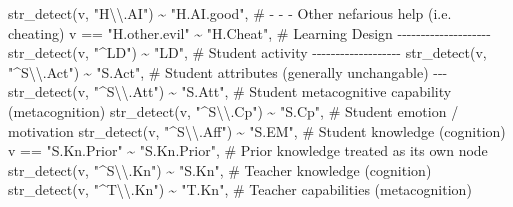 \documentclass[
  letterpaper,
  DIV=11,
  numbers=noendperiod]{scrartcl}
\newenvironment{Shaded}{\begin{snugshade}}{\end{snugshade}}
\newcommand{\CommentTok}[1]{\textcolor[rgb]{0.37,0.37,0.37}{#1}}
\newcommand{\FunctionTok}[1]{\textcolor[rgb]{0.28,0.35,0.67}{#1}}
\newcommand{\NormalTok}[1]{\textcolor[rgb]{0.00,0.23,0.31}{#1}}
\newcommand{\SpecialCharTok}[1]{\textcolor[rgb]{0.37,0.37,0.37}{#1}}
\newcommand{\StringTok}[1]{\textcolor[rgb]{0.13,0.47,0.30}{#1}}
\begin{document}
\begin{Shaded}
\begin{Highlighting}[]
        \FunctionTok{str\_detect}\NormalTok{(v, }\StringTok{"H}\SpecialCharTok{\textbackslash{}\textbackslash{}}\StringTok{.AI"}\NormalTok{) }\SpecialCharTok{\textasciitilde{}} \StringTok{"H.AI.good"}\NormalTok{,}
        \CommentTok{\# {-} {-} {-} Other nefarious help (i.e. cheating)}
\NormalTok{        v }\SpecialCharTok{==} \StringTok{"H.other.evil"} \SpecialCharTok{\textasciitilde{}} \StringTok{"H.Cheat"}\NormalTok{,}
        \CommentTok{\# Learning Design {-}{-}{-}{-}{-}{-}{-}{-}{-}{-}{-}{-}{-}{-}{-}{-}{-}{-}{-}{-}}
        \FunctionTok{str\_detect}\NormalTok{(v, }\StringTok{"\^{}LD"}\NormalTok{) }\SpecialCharTok{\textasciitilde{}} \StringTok{"LD"}\NormalTok{,}
        \CommentTok{\# Student activity {-}{-}{-}{-}{-}{-}{-}{-}{-}{-}{-}{-}{-}{-}{-}{-}{-}{-}{-}}
        \FunctionTok{str\_detect}\NormalTok{(v, }\StringTok{"\^{}S}\SpecialCharTok{\textbackslash{}\textbackslash{}}\StringTok{.Act"}\NormalTok{) }\SpecialCharTok{\textasciitilde{}} \StringTok{"S.Act"}\NormalTok{,}
        \CommentTok{\# Student attributes (generally unchangable) {-}{-}{-}}
        \FunctionTok{str\_detect}\NormalTok{(v, }\StringTok{"\^{}S}\SpecialCharTok{\textbackslash{}\textbackslash{}}\StringTok{.Att"}\NormalTok{) }\SpecialCharTok{\textasciitilde{}} \StringTok{"S.Att"}\NormalTok{,}
        \CommentTok{\# Student metacognitive capability (metacognition)}
        \FunctionTok{str\_detect}\NormalTok{(v, }\StringTok{"\^{}S}\SpecialCharTok{\textbackslash{}\textbackslash{}}\StringTok{.Cp"}\NormalTok{) }\SpecialCharTok{\textasciitilde{}} \StringTok{"S.Cp"}\NormalTok{,}
        \CommentTok{\# Student emotion / motivation}
        \FunctionTok{str\_detect}\NormalTok{(v, }\StringTok{"\^{}S}\SpecialCharTok{\textbackslash{}\textbackslash{}}\StringTok{.Aff"}\NormalTok{) }\SpecialCharTok{\textasciitilde{}} \StringTok{"S.EM"}\NormalTok{,}
        \CommentTok{\# Student knowledge (cognition)}
\NormalTok{        v }\SpecialCharTok{==} \StringTok{"S.Kn.Prior"} \SpecialCharTok{\textasciitilde{}} \StringTok{"S.Kn.Prior"}\NormalTok{, }\CommentTok{\# Prior knowledge treated as it\textquotesingle{}s own node}
        \FunctionTok{str\_detect}\NormalTok{(v, }\StringTok{"\^{}S}\SpecialCharTok{\textbackslash{}\textbackslash{}}\StringTok{.Kn"}\NormalTok{) }\SpecialCharTok{\textasciitilde{}} \StringTok{"S.Kn"}\NormalTok{,}
        \CommentTok{\# Teacher knowledge (cognition)}
        \FunctionTok{str\_detect}\NormalTok{(v, }\StringTok{"\^{}T}\SpecialCharTok{\textbackslash{}\textbackslash{}}\StringTok{.Kn"}\NormalTok{) }\SpecialCharTok{\textasciitilde{}} \StringTok{"T.Kn"}\NormalTok{,}
        \CommentTok{\# Teacher capabilities (metacognition)}

\end{Highlighting}
\end{Shaded}
\end{document}

